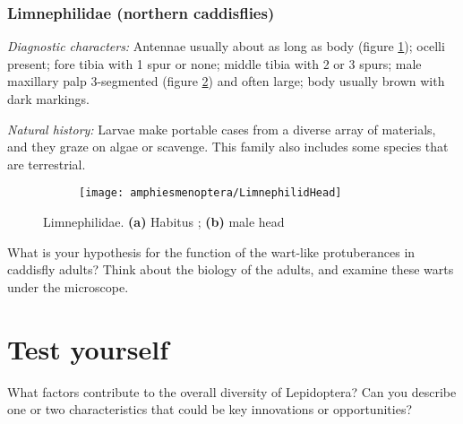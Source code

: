 \subsubsection{Limnephilidae (northern caddisflies)}
\noindent{}\textit{Diagnostic characters:} Antennae usually about as long as body (figure \ref{fig:limnephilid1}); ocelli present; fore tibia with 1 spur or none; middle tibia with 2 or 3 spurs; male maxillary palp 3-segmented (figure \ref{fig:limnephilid2}) and often large; body usually brown with dark markings.\vspace{3mm}

\noindent{}\textit{Natural history:} Larvae make portable cases from a diverse array of materials, and they graze on algae or scavenge. This family also includes some species that are terrestrial.

\begin{figure}[ht!]
    \centering
    \begin{subfigure}[ht!]{0.68\textwidth}
        \caption{}
        \label{fig:limnephilid1}
    \end{subfigure}
    \hfill
    \begin{subfigure}[ht!]{0.15\textwidth}
        \texttt{[image: amphiesmenoptera/LimnephilidHead]}
        \caption{}
        \label{fig:limnephilid2}
    \end{subfigure}
    \caption{Limnephilidae. \textbf{(a)} Habitus \citep[Modified from Fig. 641 in][]{bhl50956}; \textbf{(b)} male head \citep[][Fig. 65]{bhl50956}}\label{fig:limnephilids}
\end{figure}

\begin{theo}
{}What is your hypothesis for the function of the wart-like protuberances in caddisfly adults? Think about the biology of the adults, and examine these warts under the microscope.
\end{theo}

\FloatBarrier

\section*{Test yourself}
\noindent{}What factors contribute to the overall diversity of Lepidoptera? Can you describe one or two characteristics that could be key innovations or opportunities?\vspace{3mm}

